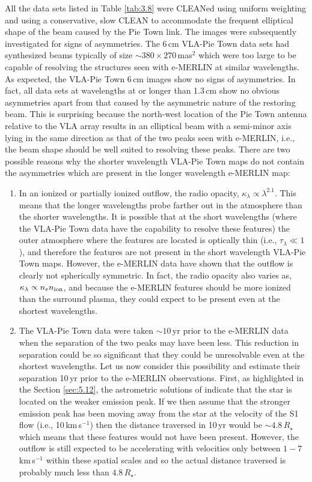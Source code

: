 All the data sets listed in Table \ref{tab:3.8} were CLEANed using uniform weighting and using a conservative, slow CLEAN to accommodate the frequent elliptical shape of the beam caused by the Pie Town link. The images were subsequently investigated for signs of asymmetries. The 6\,cm VLA-Pie Town data sets had synthesized beams typically of size $\sim 380\times 270$\,mas$^2$ which were too large to be capable of resolving the structures seen with e-MERLIN at similar wavelengths. As expected, the VLA-Pie Town 6\,cm images show no signs of asymmetries. In fact, all data sets at wavelengths at or longer than 1.3\,cm show no obvious asymmetries apart from that caused by the asymmetric nature of the restoring beam. This is surprising because the north-west location of the Pie Town antenna relative to the VLA array results in an elliptical beam with a semi-minor axis lying in the same direction as that of the two peaks seen with e-MERLIN, i.e., the beam shape should be well suited to resolving these peaks. There are two possible reasons why the shorter wavelength VLA-Pie Town maps do not contain the asymmetries which are present in the longer wavelength e-MERLIN map:
\begin{enumerate}
\item In an ionized or partially ionized outflow, the radio opacity, $\kappa _{\lambda} \propto \lambda ^{2.1}$. This means that the longer wavelengths probe farther out in the atmosphere than the shorter wavelengths. It is possible that at the short wavelengths (where the VLA-Pie Town data have the capability to resolve these features) the outer atmosphere where the features are located is optically thin (i.e., $\tau _{\lambda}\ll 1$), and therefore the features are not present in the short wavelength VLA-Pie Town maps. However, the e-MERLIN data have shown that the outflow is clearly not spherically symmetric. In fact, the radio opacity also varies as, $\kappa _{\lambda} \propto n_{e}n_{\rm{ion}}$, and because the e-MERLIN features should be more ionized than the surround plasma, they could expect to be present even at the shortest wavelengths.
\item The VLA-Pie Town data were taken $\sim 10$\,yr prior to the e-MERLIN data when the separation of the two peaks may have been less. This reduction in separation could be so significant that they could be unresolvable even at the shortest wavelengths. Let us now consider this possibility and estimate their separation  10\,yr prior to the e-MERLIN observations. First, as highlighted in the Section \ref{sec:5.12}, the astrometric solutions of \cite{harper_2008} indicate that the star is located on the weaker emission peak. If we then assume that the stronger emission peak has been moving away from the star at the velocity of the S1 flow (i.e., 10\,km\,s$^{-1}$) then the distance traversed in 10\,yr would be $\sim 4.8\,R_{\star}$ which means that these features would not have been present. However, the outflow is still expected to be accelerating with velocities only between $1-7$\,km\,s$^{-1}$ within these spatial scales \citep{carpenter_1997} and so the actual distance traversed is probably much less than $4.8\,R_{\star}$.
\end{enumerate}

